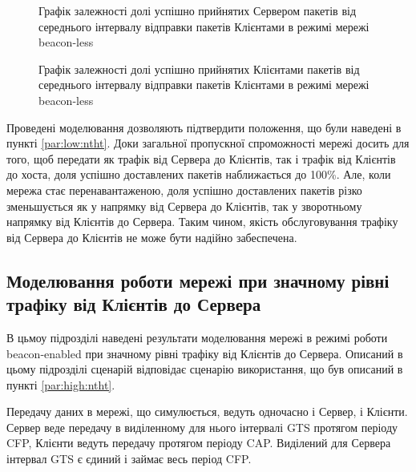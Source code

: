 \documentclass[a4paper,ukrainian,utf8,nocolumnsxix,floatsection,equationsection]{eskdtext}
\newcommand{\longcaption}[1]{\captionsetup{style=figureLongCaption}\caption{#1}}
\newcommand{\blm}[0]{beacon-less\xspace}
\newcommand{\bem}[0]{beacon-enabled\xspace}
\begin{document}
\begin{figure}[htbp]
	\centering
	\longcaption{\label{fig:result_test_backtraf_nobeac_brd_succ_rate}Графік залежності долі успішно прийнятих Сервером пакетів від середнього інтервалу відправки пакетів Клієнтами в режимі мережі \blm}
\end{figure}

\begin{figure}[htbp]
	\centering
	\longcaption{\label{fig:result_test_backtraf_nobeac_brd_deliv}Графік залежності долі успішно прийнятих Клієнтами пакетів від середнього інтервалу відправки пакетів Клієнтами в режимі мережі \blm}
\end{figure}


Проведені моделювання дозволяють підтвердити положення, що були наведені в пункті \ref{par:low:ntht}. Доки загальної пропускної спроможності мережі досить для того, щоб передати як трафік від Сервера до Клієнтів, так і трафік від Клієнтів до хоста, доля успішно доставлених пакетів наближається до 100\%. Але, коли мережа стає перенавантаженою, доля успішно доставлених пакетів різко зменьшується як у напрямку від Сервера до Клієнтів, так у зворотньому напрямку від Клієнтів до Сервера. Таким чином, якість обслуговування трафіку від Сервера до Клієнтів не може бути надійно забеспечена.


\subsection{Моделювання роботи мережі при значному рівні трафіку від Клієнтів до Сервера}
\label{par:simulation_backtraf_beac}

В цьмоу підрозділі наведені результати моделювання мережі в режимі роботи \bem при значному рівні трафіку від Клієнтів до Сервера. Описаний в цьому підрозділі сценарій відповідає сценарію використання, що був описаний в пункті \ref{par:high:ntht}.

Передачу даних в мережі, що симулюється, ведуть одночасно і Сервер, і Клієнти. Сервер веде передачу в виділенному для нього інтервалі GTS протягом періоду CFP, Клієнти ведуть передачу протягом періоду CAP. Виділений для Сервера інтервал GTS є єдиний і займає весь період CFP.
\end{document}
